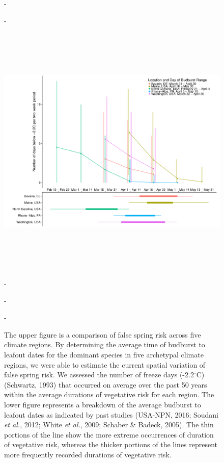 \documentclass{article}\usepackage[]{graphicx}\usepackage[]{color}
\begin{document}
\begin{figure} [H] 
 -\begin{center}
 -\includegraphics[width=16cm, height=13cm]{..//figure/RegRisk_clean.pdf} 
 -\caption{The upper figure is a comparison of false spring risk across five climate regions. By determining the average time of budburst to leafout dates for the dominant species in five archetypal climate regions, we were able to estimate the current spatial variation of false spring risk. We assessed the number of freeze days (-2.2$^{\circ}$C) (Schwartz, 1993) that occurred on average over the past 50 years within the average durations of vegetative risk for each region. The lower figure represents a breakdown of the average budburst to leafout dates as indicated by past studies (USA-NPN, 2016; Soudani \textit{et al.}, 2012; White \textit{et al.}, 2009; Schaber \& Badeck, 2005). The thin portions of the line show the more extreme occurrences of duration of vegetative risk, whereas the thicker portions of the lines represent more frequently recorded durations of vegetative risk. }\label{fig:regional} 
 -\end{center}
 -\end{figure}
\end{document}
